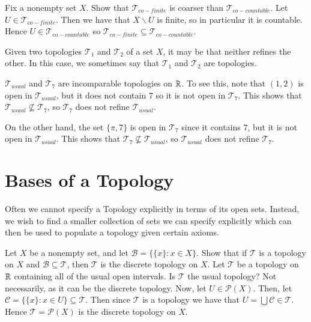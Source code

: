 \documentclass[12pt, a4paper, oneside, openright, titlepage]{book}
\begin{document}
\begin{exercise}
    Fix a nonempty set $X$. Show that $\mathcal{T}_{co-finite}$ is coarser than $\mathcal{T}_{co-countable}$. Let $U \in \mathcal{T}_{co-finite}$. Then we have that $X\backslash U$ is finite, so in particular it is countable. Hence $U \in \mathcal{T}_{co-countable}$ so $\mathcal{T}_{co-finite} \subseteq \mathcal{T}_{co-countable}$.
\end{exercise}

\begin{remark}
    Given two topologies $\mathcal{T}_1$ and $\mathcal{T}_2$ of a set $X$, it may be that neither refines the other. In this case, we sometimes say that $\mathcal{T}_1$ and $\mathcal{T}_2$ are  topologies.
\end{remark}

\begin{example}
    $\mathcal{T}_{usual}$ and $\mathcal{T}_7$ are incomparable topologies on $\mathbb R$. To see this, note that $(1,2)$ is open in $\mathcal{T}_{usual}$, but it does not contain $7$ so it is not open in $\mathcal{T}_7$. This shows that $\mathcal{T}_{usual}\nsubseteq \mathcal{T}_7$, so $\mathcal{T}_7$ does not refine $\mathcal{T}_{usual}$. 

    On the other hand, the set $\{\pi,7\}$ is open in $\mathcal{T}_7$ since it contains $7$, but it is not open in $\mathcal{T}_{usual}$. This shows that $\mathcal{T}_7 \nsubseteq \mathcal{T}_{usual}$, so $\mathcal{T}_{usual}$ does not refine $\mathcal{T}_7$.
\end{example}



\section{Bases of a Topology}

Often we cannot specify a Topology explicitly in terms of its open sets. Instead, we wish to find a smaller collection of sets we can specify explicitly which can then be used to populate a topology given certain axioms. 

\begin{exercise}
    Let $X$ be a nonempty set, and let $\mathcal{B} = \{\{x\}:x \in X\}$. Show that if $\mathcal{T}$ is a topology on $X$ and $\mathcal{B}\subseteq \mathcal{T}$, then $\mathcal{T}$ is the discrete topology on $X$. Let $\mathcal{T}$ be a topology on $\mathbb R$ containing all of the usual open intervals. Is $\mathcal{T}$ the usual topology? Not necessarily, as it can be the discrete topology. Now, let $U \in \mathcal{P}(X)$. Then, let $\mathcal{C} = \{\{x\}:x\in U\} \subseteq \mathcal{T}$. Then since $\mathcal{T}$ is a topology we have that $U = \bigcup\mathcal{C}\in \mathcal{T}$. Hence $\mathcal{T} = \mathcal{P}(X)$ is the discrete topology on $X$.
\end{exercise}
\end{document}
